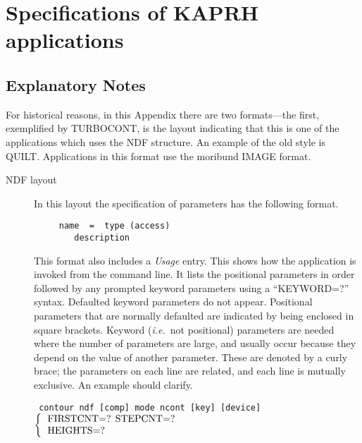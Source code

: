 \documentclass[twoside,11pt]{article}
\newcommand{\htmlref}[2]{#1}
\newcommand{\xlabel}[1]{}
\newcommand{\ssttt}{\tt}
\begin{document}
\newpage
\section{\xlabel{ap_full}Specifications of KAPRH applications\label{ap:full}}
\subsection{Explanatory Notes}
For historical reasons, in this Appendix there are two formats---the
first, exemplified by \htmlref{TURBOCONT}{TURBOCONT}, is the layout indicating
that this is one of the applications which uses the NDF structure. An
example of the old style is \htmlref{QUILT}{QUILT}.  Applications
in this format use the moribund \htmlref{IMAGE format}{ap:IMAGEformat}.

\begin{description}
\item [NDF layout]
In this layout the specification of parameters has the following
format. 

\begin{verbatim}
     name  =  type (access)
        description
\end{verbatim}
This format also includes a {\em Usage\/} entry.  \label{ap:usage}
This shows how the application is invoked from the command line.  It
lists the positional parameters in order followed by any prompted
keyword parameters using a \mbox{``KEYWORD=?''} syntax.  Defaulted
keyword parameters do not appear.  Positional parameters that are
normally defaulted are indicated by being enclosed in square brackets.
Keyword ({\it{i.e.}}\ not positional) parameters are needed where the
number of parameters are large, and usually occur because they depend
on the value of another parameter.  These are denoted by a curly
brace; the parameters on each line are related, and each line is
mutually exclusive.  An example should clarify.
\bigskip

{\ssttt \hspace*{1.0em}
        contour ndf [comp] mode ncont [key] [device] 
        \newline\hspace*{2.5em}
        $\left\{ {\begin{tabular}{l}
                    FIRSTCNT=? STEPCNT=? \\
                    HEIGHTS=?
                   \end{tabular} }
        \right.$
        \newline\hspace*{2.9em}
}
\bigskip


\end{description}
\end{document}
